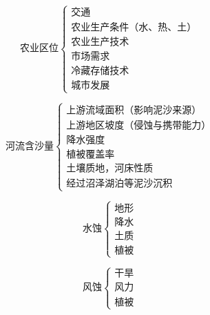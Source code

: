 \documentclass[UTF8]{ctexart}
\begin{document}
\par

\begin{multicols}{2}
    
    \[
        \textbf{农业区位}
        \begin{cases}
            \text{交通}\\
            \text{农业生产条件（水、热、土）}\\
            \text{农业生产技术}\\
            \text{市场需求}\\
            \text{冷藏存储技术}\\
            \text{城市发展}
        \end{cases}
    \]

    \[
        \textbf{河流含沙量}
        \begin{cases}
            \text{上游流域面积（影响泥沙来源）}\\
            \text{上游地区坡度（侵蚀与携带能力）}\\
            \text{降水强度}\\
            \text{植被覆盖率}\\
            \text{土壤质地，河床性质}\\
            \text{经过沼泽湖泊等泥沙沉积}
        \end{cases}
    \]

\end{multicols}

\par

\begin{multicols}{2}

    \[
        \textbf{水蚀}
        \begin{cases}
            \text{地形}\\
            \text{降水}\\
            \text{土质}\\
            \text{植被}
        \end{cases}
    \]

    \[
        \textbf{风蚀}
        \begin{cases}
            \text{干旱}\\
            \text{风力}\\
            \text{植被}
        \end{cases}
    \]
    
\end{multicols}
\end{document}

